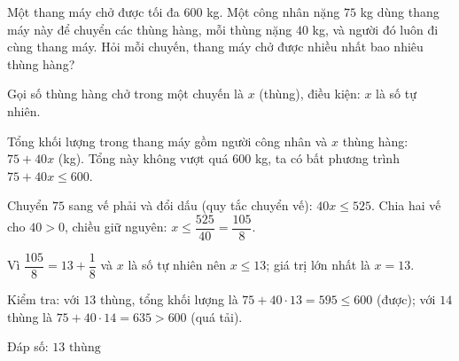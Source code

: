 \begin{problem}[9DS-BPT-014]
Một thang máy chở được tối đa $600$ kg. Một công nhân nặng $75$ kg dùng thang máy này để chuyển các thùng hàng, mỗi thùng nặng $40$ kg, và người đó luôn đi cùng thang máy. Hỏi mỗi chuyến, thang máy chở được nhiều nhất bao nhiêu thùng hàng?

\begin{solution}
Gọi số thùng hàng chở trong một chuyến là $x$ (thùng), điều kiện: $x$ là số tự nhiên.

Tổng khối lượng trong thang máy gồm người công nhân và $x$ thùng hàng: $75 + 40x$ (kg). Tổng này không vượt quá $600$ kg, ta có bất phương trình $75 + 40x \leq 600$.

Chuyển $75$ sang vế phải và đổi dấu (quy tắc chuyển vế): $40x \leq 525$. Chia hai vế cho $40 > 0$, chiều giữ nguyên: $x \leq \dfrac{525}{40} = \dfrac{105}{8}$.

Vì $\dfrac{105}{8} = 13 + \dfrac{1}{8}$ và $x$ là số tự nhiên nên $x \leq 13$; giá trị lớn nhất là $x = 13$.

Kiểm tra: với $13$ thùng, tổng khối lượng là $75 + 40 \cdot 13 = 595 \leq 600$ (được); với $14$ thùng là $75 + 40 \cdot 14 = 635 > 600$ (quá tải).

Đáp số: $\boxed{13 \text{ thùng}}$
\end{solution}
\end{problem}

